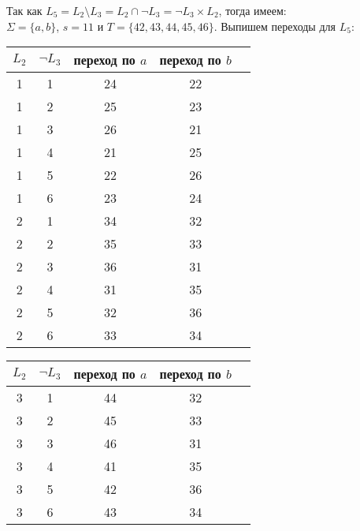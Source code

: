 \documentclass{article}
\begin{document}
\begin{enumerate}
        Так как \(L_5= L_2 \setminus L_3 = L_2 \cap \neg L_3 = \neg L_3 \times L_2\), тогда имеем:\\ \(\Sigma=\{a,b\}\), \(s=11\) и \(T=\{42, 43, 44, 45, 46\}\). Выпишем переходы для \(L_5\): 
        \begin{center}
            \begin{tabular}{ |c|c|c|c|c| } 
                \hline
                \(L_2\) & \(\neg L_3\) & переход по \(a\) & переход по \(b\) \\
                \hline\hline
                1 & 1 & 24 & 22 \\
                \hline 
                1 & 2 & 25 & 23 \\
                \hline
                1 & 3 & 26 & 21 \\
                \hline
                1 & 4 & 21 & 25 \\
                \hline
                1 & 5 & 22 & 26 \\
                \hline
                1 & 6 & 23 & 24 \\
                \hline\hline
                
                2 & 1 & 34 & 32 \\
                \hline
                2 & 2 & 35 & 33 \\
                \hline
                2 & 3 & 36 & 31 \\
                \hline
                2 & 4 & 31 & 35 \\
                \hline
                2 & 5 & 32 & 36 \\
                \hline
                2 & 6 & 33 & 34 \\
                \hline
            \end{tabular} \:\:
            \begin{tabular}{ |c|c|c|c|c| } 
                \hline
                \(L_2\) & \(\neg L_3\) & переход по \(a\) & переход по \(b\) \\
                \hline\hline
                3 & 1 & 44 & 32 \\
                \hline
                3 & 2 & 45 & 33 \\
                \hline
                3 & 3 & 46 & 31 \\
                \hline
                3 & 4 & 41 & 35 \\
                \hline
                3 & 5 & 42 & 36 \\
                \hline
                3 & 6 & 43 & 34 \\
                \hline\hline
                

\end{tabular}
\end{center}
\end{enumerate}
\end{document}
